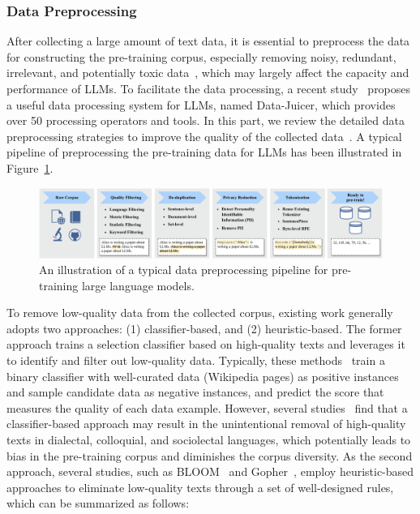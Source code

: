 \subsubsection{Data Preprocessing}
\label{sec:data_pre_processing}
After collecting a large amount of text data, it is essential to preprocess the data for constructing  the pre-training corpus, especially removing  noisy, redundant, irrelevant, and potentially toxic data~\cite{Rae-arxiv-2021-Scaling, Chowdhery-arxiv-2022-PaLM, Longpre-arxiv-2023-pretrainer}, which may largely affect the  capacity and performance of LLMs.  
{To facilitate the data processing, 
a recent study~\cite{Chen-2023-arxiv-Data} proposes a useful data processing system for LLMs, named Data-Juicer, which provides over 50 processing operators and tools.}
In this part, we review the detailed data preprocessing strategies to improve the quality of the collected data~\cite{Rae-arxiv-2021-Scaling,Du-ICML-2022-GLaM,Scao-arxiv-2022-BLOOM}. 
{A typical pipeline of preprocessing the pre-training data for LLMs has been illustrated in Figure~\ref{fig:processing-pipeline}.}

\begin{figure}
    \centering
    \includegraphics[width=1\textwidth]{images/pipeline_0331.pdf}
    \caption{An illustration of a typical data preprocessing pipeline for pre-training large language models. }
    \label{fig:processing-pipeline}
\end{figure}


To remove low-quality data from the collected corpus, existing work generally adopts two approaches: (1) classifier-based, and (2) heuristic-based. 
The former approach  trains a selection classifier based on high-quality texts and leverages it to identify and filter out low-quality data. 
Typically, these methods~\cite{Brown-NeurIPS-2020-Language,Du-ICML-2022-GLaM,Chowdhery-arxiv-2022-PaLM} train a binary classifier with well-curated data (\eg Wikipedia pages) as positive instances and sample candidate data as negative instances, and predict the score that measures  the quality of each data  example. 
However, several studies~\cite{Du-ICML-2022-GLaM, Rae-arxiv-2021-Scaling} find that a classifier-based approach may result in the unintentional removal of high-quality texts in dialectal, colloquial, and sociolectal languages, which potentially leads to bias in the pre-training corpus and diminishes the corpus diversity.
As the second approach, several studies, such as BLOOM~\cite{Scao-arxiv-2022-BLOOM} and Gopher~\cite{Rae-arxiv-2021-Scaling}, employ heuristic-based approaches to eliminate low-quality texts through a set of well-designed rules, which can be summarized as follows:

